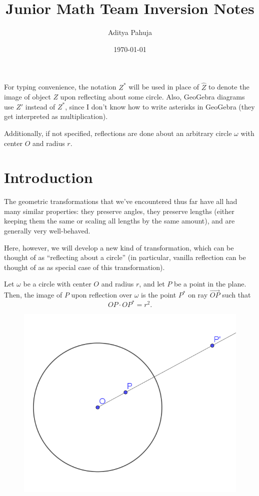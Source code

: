 \documentclass{scrartcl}
\title{Junior Math Team Inversion Notes}
\author{Aditya Pahuja}
\date{\today}
\begin{document}
\maketitle

\tableofcontents

\begin{note}
	For typing convenience, the notation $Z^\ast$ will be used
in place of $\hat Z$ to denote the image of object $Z$
upon reflecting about some circle.
Also, GeoGebra diagrams use $Z'$ instead of $Z^\ast$,
since I don't know how to write asterisks in GeoGebra
(they get interpreted as multiplication).

Additionally, if not specified, reflections are done about
an arbitrary circle $\omega$ with center $O$ and radius $r$.
\end{note}

\pagebreak

\section{Introduction}

The geometric transformations that we've encountered thus far
have all had many similar properties: they preserve angles,
they preserve lengths (either keeping them the same or
scaling all lengths by the same amount), and are generally very well-behaved.

Here, however, we will develop a new kind of transformation,
which can be thought of as ``reflecting about a circle''
(in particular, vanilla reflection can be thought of as
as special case of this transformation).

\begin{definition}
	Let $\omega$ be a circle with center $O$ and radius $r$,
	and let $P$ be a point in the plane. Then, the image of $P$
	upon reflection over $\omega$ is the point $P^\ast$
	on ray $\overrightarrow{OP}$ such that
	\[OP\cdot OP^\ast = r^2.\]
\end{definition}

\begin{figure}[h]
	\centering
	\includegraphics[width=0.6\linewidth]{inversion_definition}
	\label{fig:inversiondefinition}
\end{figure}
\end{document}
